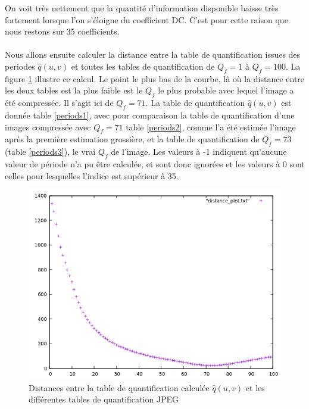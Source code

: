 \documentclass[utf8,final]{stageM2R} %
\begin{document}
On voit très nettement que la quantité d'information disponible baisse très fortement lorsque l'on s'éloigne du coefficient DC. C'est pour cette raison que nous restons sur 35 coefficients.

\paragraph{}
Nous allons ensuite calculer la distance entre la table de quantification issues des periodes $\widehat{q}(u,v)$ et toutes les tables de quantification de $Q_f = 1$ à $Q_f = 100$. La figure \ref{fig:distances} illustre ce calcul. Le point le plus bas de la courbe, là où la distance entre les deux tables est la plus faible est le $Q_f$ le plus probable avec lequel l'image a été compressée. Il s'agit ici de $Q_f = 71$. La table de quantification $\widehat{q}(u,v)$ est donnée table \ref{periods1}, avec pour comparaison la table de quantification d'une images compressée avec $Q_f = 71$ table \ref{periods2}, comme l'a été estimée l'image après la première estimation grossière, et la table de quantification de $Q_f = 73$ (table \ref{periods3}), le vrai $Q_f$ de l'image. Les valeurs à -1 indiquent qu'aucune valeur de période n'a pu être calculée, et sont donc ignorées et les valeurs à 0 sont celles pour lesquelles l'indice est supérieur à 35.

\begin{figure}
  \centering
  \includegraphics[width=0.7\linewidth]{images/distances}

  \caption{Distances entre la table de quantification calculée $\widehat{q}(u,v)$ et les différentes tables de quantification JPEG}
  \label{fig:distances}
\end{figure}
\end{document}
